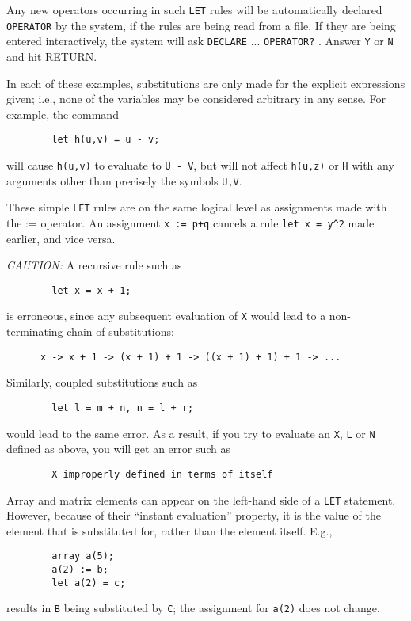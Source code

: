 Any new operators occurring in such {\tt LET} rules will be automatically
declared {\tt OPERATOR} by the system, if the rules are being read from a
file.  If they are being entered interactively, the system will ask
{\tt DECLARE} ... {\tt OPERATOR?} .  Answer {\tt Y} or {\tt N} and hit RETURN.

In each of these examples, substitutions are only made for the explicit
expressions given; i.e., none of the variables may be considered arbitrary
in any sense. For example, the command
\begin{verbatim}
        let h(u,v) = u - v;
\end{verbatim}
will cause {\tt h(u,v)} to evaluate to {\tt U - V}, but will not affect
{\tt h(u,z)} or {\tt H} with any arguments other than precisely the
symbols {\tt U,V}.

These simple {\tt LET} rules are on the same logical level as assignments
made with the := operator.  An assignment {\tt x := p+q} cancels a rule
{\tt let x = y\^{ }2} made earlier, and vice versa.

{\it CAUTION:} A recursive rule such as
\begin{verbatim}
        let x = x + 1;
\end{verbatim}
is erroneous, since any subsequent evaluation of {\tt X} would lead to a
non-terminating chain of substitutions:
\begin{verbatim}
      x -> x + 1 -> (x + 1) + 1 -> ((x + 1) + 1) + 1 -> ...
\end{verbatim}
Similarly, coupled substitutions such as
\begin{verbatim}
        let l = m + n, n = l + r;
\end{verbatim}
would lead to the same error. As a result, if you try to evaluate an {\tt X},
{\tt L} or {\tt N} defined as above, you will get an error such as
\begin{verbatim}
        X improperly defined in terms of itself
\end{verbatim}

Array and matrix elements can appear on the left-hand side of a {\tt LET}
statement. However, because of their ``instant evaluation'' property, it is
the value of the element that is substituted for, rather than the element
itself. E.g.,
\begin{verbatim}
        array a(5);
        a(2) := b;
        let a(2) = c;
\end{verbatim}
results in {\tt B} being substituted by {\tt C}; the assignment for
{\tt a(2)} does not change.

